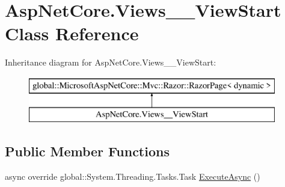 \hypertarget{class_asp_net_core_1_1_views_____view_start}{}\section{Asp\+Net\+Core.\+Views\+\_\+\+\_\+\+View\+Start Class Reference}
\label{class_asp_net_core_1_1_views_____view_start}
Inheritance diagram for Asp\+Net\+Core.\+Views\+\_\+\+\_\+\+View\+Start\+:\begin{figure}[H]
\begin{center}
\leavevmode
\includegraphics[height=2.000000cm]{class_asp_net_core_1_1_views_____view_start}
\end{center}
\end{figure}
\subsection*{Public Member Functions}
\begin{DoxyCompactItemize}
\item 
async override global\+::\+System.\+Threading.\+Tasks.\+Task \mbox{\hyperlink{class_asp_net_core_1_1_views_____view_start_ab3395816bd37d1d7f8ed1bceafaab28f}{Execute\+Async}} ()
\end{DoxyCompactItemize}
